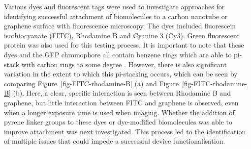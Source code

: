 \documentclass[
  a4paper,
]{scrbook}
\begin{document}
Various dyes and fluorescent tags were used to investigate approaches
for identifying successful attachment of biomolecules to a carbon
nanotube or graphene surface with fluorescence microscopy. The dyes
included fluorescein isothiocyanate (FITC), Rhodamine B and Cyanine 3
(Cy3). Green fluorescent protein was also used for this testing process.
It is important to note that these dyes and the GFP chromophore all
contain benzene rings which are able to pi-stack with carbon rings to
some degree
\autocite{Nakayama-Ratchford2007,Tang2012,Khrenova2019,Qiu2019}.
However, there is also significant variation in the extent to which this
pi-stacking occurs, which can be seen by comparing
Figure~\ref{fig-FITC-rhodamine-B} (a) and
Figure~\ref{fig-FITC-rhodamine-B} (b). Here, a clear, specific
interaction is seen between Rhodamine B and graphene, but little
interaction between FITC and graphene is observed, even when a longer
exposure time is used when imaging. Whether the addition of pyrene
linker groups to these dyes or dye-modified biomolecules was able to
improve attachment was next investigated. This process led to the
identification of multiple issues that could impede a successful device
functionalisation.
\end{document}
